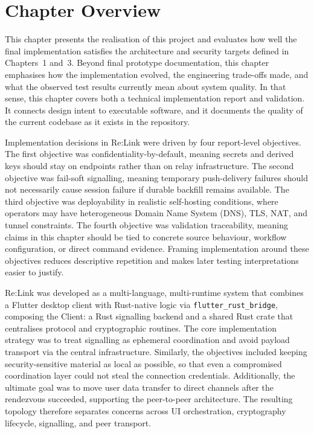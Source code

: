 \documentclass[12pt,a4paper,oneside]{report}
\begin{document}
\section{Chapter Overview}
\label{sec:impl-overview}

This chapter presents the realisation of this project and evaluates how well the final implementation satisfies the architecture and security targets defined in Chapters~1 and~3. Beyond final prototype documentation, this chapter emphasises how the implementation evolved, the engineering trade-offs made, and what the observed test results currently mean about system quality. In that sense, this chapter covers both a technical implementation report and validation. It connects design intent to executable software, and it documents the quality of the current codebase as it exists in the repository.

Implementation decisions in Re:Link were driven by four report-level objectives. The first objective was confidentiality-by-default, meaning secrets and derived keys should stay on endpoints rather than on relay infrastructure. The second objective was fail-soft signalling, meaning temporary push-delivery failures should not necessarily cause session failure if durable backfill remains available. The third objective was deployability in realistic self-hosting conditions, where operators may have heterogeneous Domain Name System (DNS), TLS, NAT, and tunnel constraints. The fourth objective was validation traceability, meaning claims in this chapter should be tied to concrete source behaviour, workflow configuration, or direct command evidence. Framing implementation around these objectives reduces descriptive repetition and makes later testing interpretations easier to justify.

Re:Link was developed as a multi-language, multi-runtime system that combines a Flutter desktop client with Rust-native logic via \texttt{flutter\_rust\_bridge}, composing the Client: a Rust signalling backend and a shared Rust crate that centralises protocol and cryptographic routines. The core implementation strategy was to treat signalling as ephemeral coordination and avoid payload transport via the central infrastructure. Similarly, the objectives included keeping security-sensitive material as local as possible, so that even a compromised coordination layer could not steal the connection credentials. Additionally, the ultimate goal was to move user data transfer to direct channels after the rendezvous succeeded, supporting the peer-to-peer architecture. The resulting topology therefore separates concerns across UI orchestration, cryptography lifecycle, signalling, and peer transport.
\end{document}
